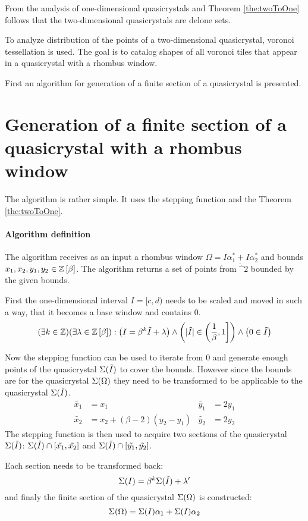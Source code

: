 \documentclass[text.tex]{subfiles}
\begin{document}
From the analysis of one-dimensional quasicrystals and Theorem \ref{the:twoToOne} follows that the two-dimensional quasicrystals are delone sets.  

To analyze distribution of the points of a two-dimensional quasicrystal, voronoi tessellation is used. The goal is to catalog shapes of all voronoi tiles that appear in a quasicrystal with a rhombus window. 

First an algorithm for generation of a finite section of a quasicrystal is presented. 

\section{Generation of a finite section of a quasicrystal with a rhombus window}
The algorithm is rather simple. It uses the stepping function and the Theorem \ref{the:twoToOne}. 

\paragraph{Algorithm definition} The algorithm receives as an input a rhombus window $\Omega = I\alpha_1^\ast + I\alpha_2^\ast$ and bounds $x_1, x_2, y_1, y_2 \in \mathbb{Z}\left[\beta\right]$.
The algorithm returns a set of points from $\ring^2$ bounded by the given bounds.

First the one-dimensional interval $I = [c,d)$ needs to be scaled and moved in such a way, that it becomes a base window and contains $0$.
$$(\exists k\in\mathbb{Z})(\exists \lambda\in\mathbb{Z}\left[\beta\right]) : \left(I = \beta^k\tilde{I}+\lambda\right) \wedge \left(|\tilde{I}| \in \left(\frac{1}{\beta},1\right] \right)\wedge \left(0\in\tilde{I}\right)$$

Now the stepping function can be used to iterate from 0 and generate enough points of the quasicrystal $\Sigma(\tilde{I})$ to cover the bounds. However since the bounds are for the quasicrystal $\Sigma(\Omega)$ they need to be transformed to be applicable to the quasicrystal $\Sigma(\tilde{I})$. 
\begin{align*}
\tilde{x_1} &= x_1 & \tilde{y_1} &= 2y_1 \\
\tilde{x_2} &= x_2 + (\beta-2)(y_2-y_1) & \tilde{y_2} &= 2y_2 
\end{align*}
The stepping function is then used to acquire two sections of the quasicrystal $\Sigma(\tilde{I})$: $\Sigma(\tilde{I})\cap[\tilde{x_1},\tilde{x_2}]$ and $\Sigma(\tilde{I})\cap[\tilde{y_1},\tilde{y_2}]$.

Each section needs to be transformed back:
$$\Sigma(I) = \beta^k\Sigma(\tilde{I}) + \lambda'$$
and finaly the finite section of the quasicrystal $\Sigma(\Omega)$ is constructed:
$$\Sigma(\Omega) = \Sigma(I)\alpha_1 + \Sigma(I)\alpha_2$$
\end{document}
